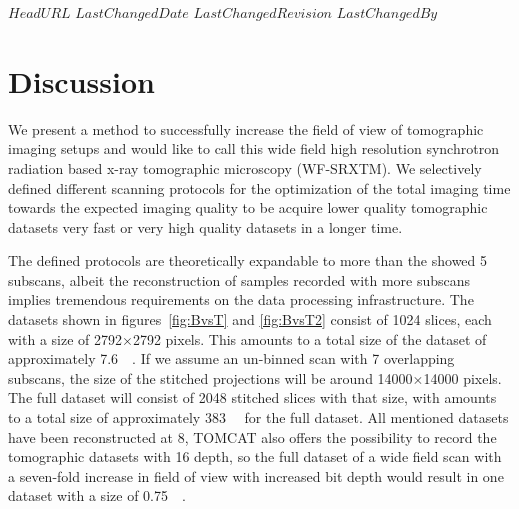 \svnidlong
{$HeadURL$}
{$LastChangedDate$}
{$LastChangedRevision$}
{$LastChangedBy$}

\ifhtml
\else
\begin{center}
\end{center}
\fi

\section{Discussion}%
We present a method to successfully increase the field of view of tomographic imaging setups and would like to call this wide field high resolution synchrotron radiation based x-ray tomographic microscopy (WF-SRXTM). We selectively defined different scanning protocols for the optimization of the total imaging time towards the expected imaging quality to be acquire lower quality tomographic datasets very fast or very high quality datasets in a longer time.

The defined protocols are theoretically expandable to more than the showed 5 subscans, albeit the reconstruction of samples recorded with more subscans implies tremendous requirements on the data processing infrastructure. The datasets shown in figures~\ref{fig:BvsT} and \ref{fig:BvsT2} consist of 1024 slices, each with a size of 2792$\times$2792 pixels. This amounts to a total size of the dataset of approximately \SI{7.6}{\giga\byte}. If we assume an un-binned scan with 7 overlapping subscans, the size of the stitched projections will be around 14000$\times$14000 pixels. The full dataset will consist of 2048 stitched slices with that size, with amounts to a total size of approximately \SI{383}{\giga\byte} for the full dataset. All mentioned datasets have been reconstructed at \SI{8}{\bit}, TOMCAT also offers the possibility to record the tomographic datasets with \SI{16}{\bit} depth, so the full dataset of a wide field scan with a seven-fold increase in field of view with increased bit depth would result in one dataset with a size of \SI{0.75}{\tera\byte}.

